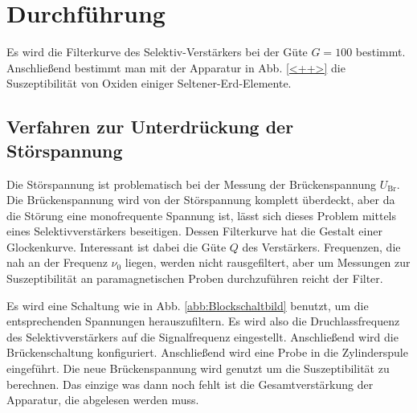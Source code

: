 \section{Durchführung}
\label{sec:Durchführung}

Es wird die Filterkurve des Selektiv-Verstärkers bei der Güte 
$G=\num{100}$ bestimmt. 
Anschließend bestimmt man mit der Apparatur in Abb. \ref{<++>} die 
Suszeptibilität von Oxiden einiger Seltener-Erd-Elemente. 


\subsection{Verfahren zur Unterdrückung der Störspannung}

Die Störspannung ist problematisch bei der Messung der Brückenspannung $U_\text{Br}$. 
Die Brückenspannung wird von der Störspannung komplett überdeckt, aber da die Störung 
eine monofrequente Spannung ist, lässt sich dieses Problem mittels eines 
Selektivverstärkers beseitigen. Dessen Filterkurve hat die Gestalt einer Glockenkurve. 
Interessant ist dabei die Güte $Q$ des Verstärkers. 
Frequenzen, die nah an der Frequenz $\nu_0$ liegen, werden nicht rausgefiltert, aber um 
Messungen zur Suszeptibilität an paramagnetischen Proben durchzuführen reicht der Filter. 

Es wird eine Schaltung wie in Abb. \ref{abb:Blockschaltbild} benutzt, um die 
entsprechenden Spannungen herauszufiltern. 
Es wird also die Druchlassfrequenz des Selektivverstärkers auf die Signalfrequenz 
eingestellt. Anschließend wird die Brückenschaltung konfiguriert. Anschließend wird eine 
Probe in die Zylinderspule eingeführt. Die neue Brückenspannung wird genutzt um die 
Suszeptibilität zu berechnen. Das einzige was dann noch fehlt ist die Gesamtverstärkung 
der Apparatur, die abgelesen werden muss. 